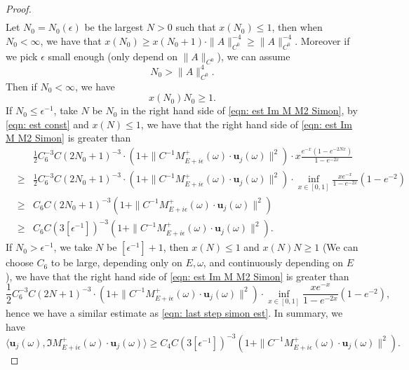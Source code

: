 \documentclass[10pt,a4paper]{amsart}
\begin{document}
\begin{proof}
\begin{eqnarray*}
\end{eqnarray*}
Let $N_0=N_0(\epsilon)$ be the largest $N>0$ such that $x(N_0)\leq 1$, then when $N_0<\infty$, we have that $x(N_0)\geq x(N_0+1)\cdot \|A\|_{C^0}^{-4}\geq \|A\|_{C^0}^{-4}$. Moreover if we pick $\epsilon$ small enough (only depend on $\|A\|_{C^0}$), we can assume 
\begin{equation*}
N_0> \|A\|_{C^0}^4.
\end{equation*}
Then if $N_0<\infty$, we have 
\begin{equation}\label{eqn: est const}
 x(N_0)N_0\geq 1.
\end{equation}
If $N_0\leq \epsilon^{-1}$, take $N$ be $N_0$ in the right hand side of \eqref{eqn: est Im M M2 Simon}, by \eqref{eqn: est const} and $x(N)\leq 1$, we have that the right hand side of \eqref{eqn: est Im M M2 Simon} is greater than 
\begin{eqnarray}
&& \frac{1}{2}  C_6^{-3}C(2N_0+1)^{-3} \cdot (1+\|C^{-1}M_{E+i\epsilon}^+(\omega)\cdot \mathbf{u}_j(\omega)\|^2)\cdot x\frac{e^{-x}(1-e^{-2Nx})}{1-e^{-2x}} \nonumber\\
&\geq& \frac{1}{2}  C_6^{-3}C(2N_0+1)^{-3} \cdot (1+\|C^{-1}M_{E+i\epsilon}^+(\omega)\cdot \mathbf{u}_j(\omega)\|^2)\cdot 
\inf_{x\in[0,1]}\frac{xe^{-x}}{1-e^{-2x}}(1-e^{-2})\nonumber\\
&\geq &C_6 C(2N_0+1)^{-3}(1+\|C^{-1}M_{E+i\epsilon}^+(\omega)\cdot \mathbf{u}_j(\omega)\|^2)\ \nonumber\\
&\geq & C_6 C(3[\epsilon^{-1}])^{-3}(1+\|C^{-1}M_{E+i\epsilon}^+(\omega)\cdot \mathbf{u}_j(\omega)\|^2) .\label{eqn: last step simon est}
\end{eqnarray}
If $N_0>\epsilon^{-1}$, we take $N$ be $[\epsilon^{-1}]+1$, then $x(N)\leq 1$ and $x(N)N\geq 1$ (We can choose $C_6$ to be large, depending only on $E, \omega$, and continuously depending on $E$), we have that the right hand side of \eqref{eqn: est Im M M2 Simon} is greater than
$$\frac{1}{2}  C_6^{-3}C(2N+1)^{-3} \cdot (1+\|C^{-1}M_{E+i\epsilon}^+(\omega)\cdot \mathbf{u}_j(\omega)\|^2)\cdot 
\inf_{x\in[0,1]}\frac{xe^{-x}}{1-e^{-2x}}(1-e^{-2})\nonumber,$$
hence we have a similar estimate as \eqref{eqn: last step simon est}. In summary, we have 
\begin{equation}\label{eqn: est spec H+}
\langle\mathbf{u}_j(\omega), \Im M_{E+i\epsilon}^+(\omega)\cdot \mathbf{u}_j(\omega)\rangle \geq C_4 C(3[\epsilon^{-1}])^{-3}(1+\|C^{-1}M_{E+i\epsilon}^+(\omega)\cdot \mathbf{u}_j(\omega)\|^2).
\end{equation}



\end{proof}
\end{document}
